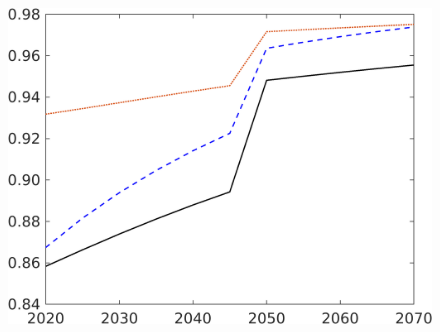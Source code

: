 \begin{figure}[h!!]
\begin{minipage}[]{0.4\textwidth}
		\includegraphics[width=1\textwidth]{../../codding_model/own_basedOnFried/optimalPol_190722_tidiedUp/figures/all_10Aout22/CompMod1_OPT_T_NoTaus_tauf_regime3_spillover0_noskill0_sep1_xgrowth0_extern0_PV1_etaa0.79_lgd0.png}
	\end{minipage}
\end{figure}

